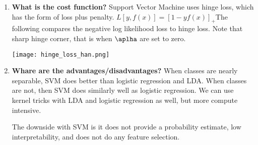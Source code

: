 \documentclass{article}
\begin{document}
\begin{enumerate}
    \item \textbf{What is the cost function?}
    \noindent 
    \smallbreak
    Support Vector Machine uses hinge loss, which has the form of loss plus penalty. $L[y, f(x)] = [1 - yf(x)]_{+}$The following compares the negative log likelihood loss to hinge loss. Note that sharp hinge corner, that is when $\aplha$ are set to zero.
    
    \texttt{[image: hinge\_loss\_han.png]}
    
    \item \textbf{Whare are the advantages/disadvantages?}
    \noindent 
    \smallbreak
    When classes are nearly separable, SVM does better than logistic regression and LDA. When classes are not, then SVM does similarly well as logistic regression. We can use kernel tricks with LDA and logistic regression as well, but more compute intensive.
    
    The downside with SVM is it does not provide a probability estimate, low interpretability, and does not do any feature selection.
    
\end{enumerate}
\end{document}
